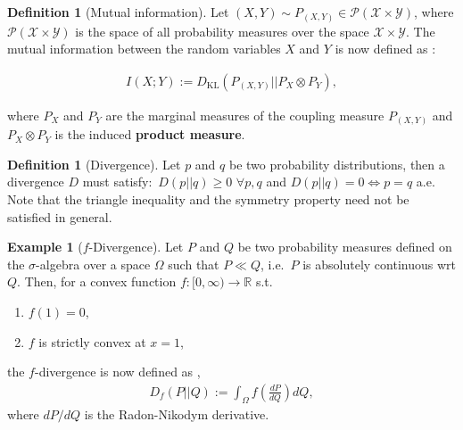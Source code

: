 \documentclass[12pt, a4paper]{article}
\numberwithin{equation}{section}
\theoremstyle{definition}
\theoremstyle{definition}
\newtheorem{defn}[thm]{Definition} %
\newtheorem{exmp}[thm]{Example} %
\begin{document}
	\begin{defn}[Mutual information]
		Let $(X, Y)\sim P_{\left(X, Y\right)}\in \mathcal P(\mathcal X\times \mathcal Y)$, where $\mathcal P(\mathcal X\times \mathcal Y)$ is the space of all probability measures over the space $\mathcal X\times \mathcal Y$. The mutual information between the random variables $X$ and $Y$ is now defined as 
		\cite[Def.~10.1]{ece_ece_5630_lectures10}:
		
		\begin{align}
			I(X; Y) := D_{\text{KL}}\left(P_{(X, Y)} \vert\vert P_{X} \otimes P_{Y}\right),
		\end{align}
	
		\noindent where $P_{X}$ and $P_{Y}$ are the marginal measures of the coupling measure $P_{(X, Y)}$ and $P_{X}\otimes P_{Y}$ is the induced \textbf{product measure}.
	\end{defn}

	\begin{defn}[Divergence]
		Let $p$ and $q$ be two probability distributions, then a divergence $D$ must satisfy:~$D(p\vert\vert q) \geq 0$ $\forall p,q$ and $D(p\vert\vert q) = 0 \Leftrightarrow p = q$ a.e. Note that the triangle inequality and the symmetry property need not be satisfied in general.
	\end{defn}

	\begin{exmp}[$f$-Divergence]
		Let $P$ and $Q$ be two probability measures defined on the $\sigma$-algebra over a space $\Omega$ such that $P \ll Q$, i.e.~$P$ is absolutely continuous wrt $Q$. Then, for a convex function $f:[0, \infty)\rightarrow \mathbb R$ s.t.
		
		\begin{enumerate}[label=(\roman*)]
			\item $f(1) = 0$, 
			\item $f$ is strictly convex at $x = 1$,
		\end{enumerate}
	
		\noindent the $f$-divergence is now defined as \cite{ece_ece_5630_lectures6}, 
		\begin{align}\label{eq:def__f_divergence}
			D_{f}(P\vert\vert Q) := \int_{\Omega} f\left( \frac{dP}{dQ} \right)dQ, 
		\end{align}
		where $dP/dQ$ is the Radon-Nikodym derivative.
	\end{exmp}
\end{document}
